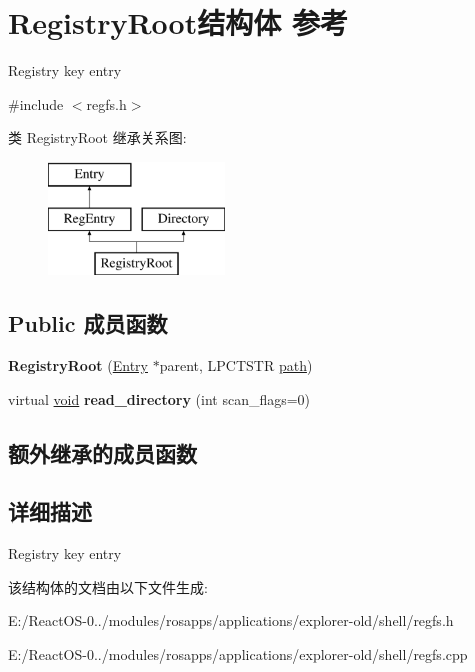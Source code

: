 \hypertarget{struct_registry_root}{}\section{Registry\+Root结构体 参考}
\label{struct_registry_root}


Registry key entry  




{\ttfamily \#include $<$regfs.\+h$>$}

类 Registry\+Root 继承关系图\+:\begin{figure}[H]
\begin{center}
\leavevmode
\includegraphics[height=3.000000cm]{struct_registry_root}
\end{center}
\end{figure}
\subsection*{Public 成员函数}
\begin{DoxyCompactItemize}
\item 
\mbox{\label{struct_registry_root_a5d3dfb5b8301b2d77a7f74b1a149f321}} 
{\bfseries Registry\+Root} (\hyperlink{struct_entry}{Entry} $\ast$parent, L\+P\+C\+T\+S\+TR \hyperlink{structpath}{path})
\item 
\mbox{\label{struct_registry_root_ab1bec5dfbc706547c712d07b3ed05f19}} 
virtual \hyperlink{interfacevoid}{void} {\bfseries read\+\_\+directory} (int scan\+\_\+flags=0)
\end{DoxyCompactItemize}
\subsection*{额外继承的成员函数}


\subsection{详细描述}
Registry key entry 

该结构体的文档由以下文件生成\+:\begin{DoxyCompactItemize}
\item 
E\+:/\+React\+O\+S-\/0../modules/rosapps/applications/explorer-\/old/shell/regfs.\+h\item 
E\+:/\+React\+O\+S-\/0../modules/rosapps/applications/explorer-\/old/shell/regfs.\+cpp\end{DoxyCompactItemize}

